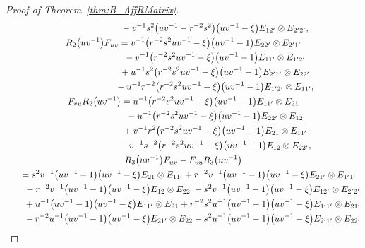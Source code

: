 \documentclass[pdftex]{sigma}
\numberwithin{equation}{section}
\begin{document}
\begin{proof}[Proof of Theorem~\ref{thm:B_AffRMatrix}]
\begin{gather*}
 \hphantom{F_{vu}R_{1}\bigl(uv^{-1}\bigr) =}{}
 - v^{-1}s^{2}\bigl(uv^{-1} - r^{-2}s^{2}\bigr)\bigl(uv^{-1} - \xi\bigr)E_{12'} \otimes E_{2'2'},
\\
 R_{2}\bigl(uv^{-1}\bigr)F_{uv} = v^{-1}\bigl(r^{-2}s^{2}uv^{-1} - \xi\bigr)\bigl(uv^{-1} - 1\bigr)E_{22'} \otimes E_{2'1'} \\
 \hphantom{R_{2}\bigl(uv^{-1}\bigr)F_{uv} = }{}
 - v^{-1}\bigl(r^{-2}s^{2}uv^{-1} - \xi\bigr)\bigl(uv^{-1} - 1\bigr)E_{11'} \otimes E_{1'2'} \\
 \hphantom{R_{2}\bigl(uv^{-1}\bigr)F_{uv} = }{}
 +u^{-1}s^{2}\bigl(r^{-2}s^{2}uv^{-1} - \xi\bigr)\bigl(uv^{-1} - 1\bigr)E_{2'1'} \otimes E_{22'} \\
 \hphantom{R_{2}\bigl(uv^{-1}\bigr)F_{uv} = }{}
 - u^{-1}r^{-2}\bigl(r^{-2}s^{2}uv^{-1} - \xi\bigr)\bigl(uv^{-1} - 1\bigr)E_{1'2'} \otimes E_{11'},
\\
 F_{vu}R_{2}\bigl(uv^{-1}\bigr) = u^{-1}\bigl(r^{-2}s^{2}uv^{-1} - \xi\bigr)\bigl(uv^{-1} - 1\bigr)E_{11'} \otimes E_{21}\\
 \hphantom{ F_{vu}R_{2}\bigl(uv^{-1}\bigr) =}{}
 - u^{-1}\bigl(r^{-2}s^{2}uv^{-1} - \xi\bigr)\bigl(uv^{-1} - 1\bigr)E_{22'} \otimes E_{12} \\
 \hphantom{ F_{vu}R_{2}\bigl(uv^{-1}\bigr) =}{}
 + v^{-1}r^{2}\bigl(r^{-2}s^{2}uv^{-1} - \xi\bigr)\bigl(uv^{-1} - 1\bigr)E_{21} \otimes E_{11'} \\
 \hphantom{ F_{vu}R_{2}\bigl(uv^{-1}\bigr) =}{}
 - v^{-1}s^{-2}\bigl(r^{-2}s^{2}uv^{-1} - \xi\bigr)\bigl(uv^{-1} - 1\bigr)E_{12} \otimes E_{22'},
\\
 R_{3}\bigl(uv^{-1}\bigr)F_{uv} - F_{vu}R_{3}\bigl(uv^{-1}\bigr) \\
\quad{} = s^{2}v^{-1}\bigl(uv^{-1} - 1\bigr)\bigl(uv^{-1} - \xi\bigr)E_{21} \otimes E_{11'}+ r^{-2}v^{-1}\bigl(uv^{-1} - 1\bigr)\bigl(uv^{-1} - \xi\bigr)E_{21'} \otimes E_{1'1'} \\
\qquad{} -r^{-2}v^{-1}\bigl(uv^{-1} - 1\bigr)\bigl(uv^{-1} - \xi\bigr)E_{12} \otimes E_{22'} - s^{2}v^{-1}\bigl(uv^{-1} - 1\bigr)\bigl(uv^{-1} - \xi\bigr)E_{12'} \otimes E_{2'2'} \\
\qquad{} + u^{-1}\bigl(uv^{-1} - 1\bigr)\bigl(uv^{-1} - \xi\bigr)E_{11'} \otimes E_{21}+r^{-2}s^{2}u^{-1}\bigl(uv^{-1} - 1\bigr)\bigl(uv^{-1} - \xi\bigr)E_{1'1'} \otimes E_{21'} \\
\qquad{}- r^{-2}u^{-1}\bigl(uv^{-1} - 1\bigr)\bigl(uv^{-1} - \xi\bigr)E_{21'} \otimes E_{22} - s^{2}u^{-1}\bigl(uv^{-1} - 1\bigr)\bigl(uv^{-1} - \xi\bigr)E_{2'1'} \otimes E_{22'} \\

\end{gather*}
\end{proof}
\end{document}
